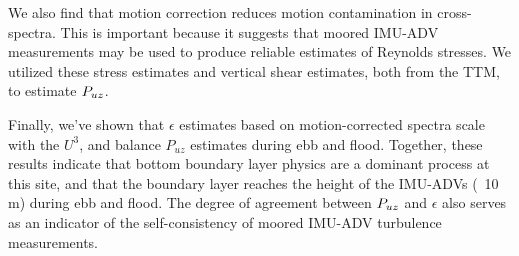 We also find that motion correction reduces motion contamination in cross-spectra. This is important because it suggests that moored IMU-ADV measurements may be used to produce reliable estimates of Reynolds stresses. We utilized these stress estimates and vertical shear estimates, both from the TTM, to estimate $P_{uz}$. 

Finally, we've shown that $\epsilon$ estimates based on motion-corrected spectra scale with the $U^3$, and balance $P_{uz}$ estimates during ebb and flood. Together, these results indicate that bottom boundary layer physics are a dominant process at this site, and that the boundary layer reaches the height of the IMU-ADVs (~10 m) during ebb and flood. The degree of agreement between $P_{uz}$ and $\epsilon$ also serves as an indicator of the self-consistency of moored IMU-ADV turbulence measurements. 



